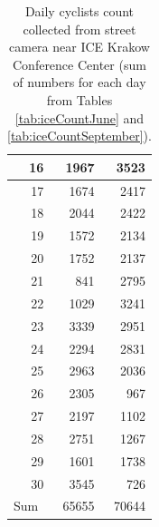 \begin{table}[H]
\begin{tabular}{|r|r|r|}
16                                     & 1967                      & 3523                           \\ \hline
17                                     & 1674                      & 2417                           \\ \hline
18                                     & 2044                      & 2422                           \\ \hline
19                                     & 1572                      & 2134                           \\ \hline
20                                     & 1752                      & 2137                           \\ \hline
21                                     & 841                       & 2795                           \\ \hline
22                                     & 1029                      & 3241                           \\ \hline
23                                     & 3339                      & 2951                           \\ \hline
24                                     & 2294                      & 2831                           \\ \hline
25                                     & 2963                      & 2036                           \\ \hline
26                                     & 2305                      & 967                            \\ \hline
27                                     & 2197                      & 1102                           \\ \hline
28                                     & 2751                      & 1267                           \\ \hline
29                                     & 1601                      & 1738                           \\ \hline
30                                     & 3545                      & 726                            \\ \hline
\multicolumn{1}{|l|}{Sum}              & 65655                     & 70644                          \\ \hline
\end{tabular}
\caption{Daily cyclists count collected from street camera near ICE Krakow Conference Center (sum of numbers for each day from Tables \ref{tab:iceCountJune} and \ref{tab:iceCountSeptember}).}
\label{tab:iceDaily}
\end{table}

